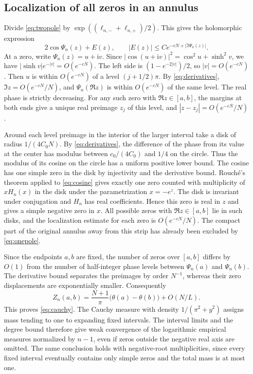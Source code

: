 \documentclass[11pt]{article}
\newcommand{\ii}{\mathrm i}
\begin{document}
\subsection{Localization of all zeros in an annulus}

Divide \eqref{eq:twopole} by \(\exp((\ell_{n,-}+\ell_{n,+})/2)\). This gives the holomorphic expression
\begin{equation}\label{eq:cosine}
 2\cos\Psi_n(z)+E(z),\qquad |E(z)|\le C e^{-cN+|\Im\Psi_n(z)|}.
\end{equation}
At a zero, write \(\Psi_n(z)=u+\ii v\). Since \(|\cos(u+\ii v)|^2=\cos^2u+\sinh^2v\), we have \(|\sinh v|e^{-|v|}=O(e^{-cN})\). The left side is \((1-e^{-2|v|})/2\), so \(|v|=O(e^{-cN})\). Then \(u\) is within \(O(e^{-cN})\) of a level \((j+1/2)\pi\). By \eqref{eq:derivatives}, \(\Im z=O(e^{-cN}/N)\), and \(\Psi_n(\Re z)\) is within \(O(e^{-cN})\) of the same level. The real phase is strictly decreasing. For any such zero with \(\Re z\in[a,b]\), the margins at both ends give a unique real preimage \(z_j\) of this level, and \(|z-z_j|=O(e^{-cN}/N)\).

Around each level preimage in the interior of the larger interval take a disk of radius \(1/(4C_0N)\). By \eqref{eq:derivatives}, the difference of the phase from its value at the center has modulus between \(c_0/(4C_0)\) and \(1/4\) on the circle. Thus the modulus of its cosine on the circle has a uniform positive lower bound. The cosine has one simple zero in the disk by injectivity and the derivative bound. Rouch\'e's theorem applied to \eqref{eq:cosine} gives exactly one zero counted with multiplicity of \(xH_n(x)\) in the disk under the parametrization \(x=-e^z\). The disk is invariant under conjugation and \(H_n\) has real coefficients. Hence this zero is real in \(z\) and gives a simple negative zero in \(x\). All possible zeros with \(\Re z\in[a,b]\) lie in such disks, and the localization estimate for each zero is \(O(e^{-cN}/N)\). The compact part of the original annulus away from this strip has already been excluded by \eqref{eq:onepole}.

Since the endpoints \(a,b\) are fixed, the number of zeros over \([a,b]\) differs by \(O(1)\) from the number of half-integer phase levels between \(\Psi_n(a)\) and \(\Psi_n(b)\). The derivative bound separates the preimages by order \(N^{-1}\), whereas their zero displacements are exponentially smaller. Consequently
\[
 Z_n(a,b)=\frac{N+1}{\pi}\bigl(\theta(a)-\theta(b)\bigr)+O(N/L).
\]
This proves \eqref{eq:cauchy}. The Cauchy measure with density \(1/(\pi^2+y^2)\) assigns mass tending to one to expanding fixed intervals. The interval limits and the degree bound therefore give weak convergence of the logarithmic empirical measures normalized by \(n-1\), even if zeros outside the negative real axis are omitted. The same conclusion holds with negative-root multiplicities, since every fixed interval eventually contains only simple zeros and the total mass is at most one.
\end{document}
